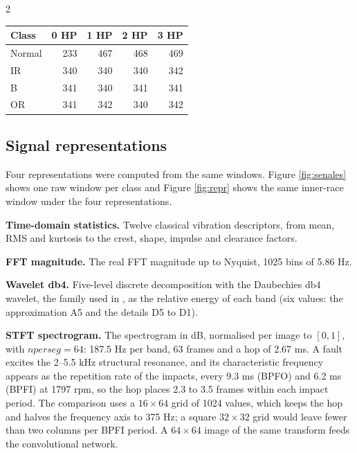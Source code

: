 \documentclass[12pt,twoside,titlepage]{ingenius}
\begin{document}
\begin{multicols}{2}
\begin{table}[H]
\centering
{}
\label{tab:ventanas}
\begin{tabular}{lrrrr}
\toprule
Class & 0 HP & 1 HP & 2 HP & 3 HP \\
\midrule
Normal & 233 & 467 & 468 & 469 \\
IR     & 340 & 340 & 340 & 342 \\
B      & 341 & 340 & 341 & 341 \\
OR     & 341 & 342 & 340 & 342 \\
\bottomrule
\end{tabular}
\end{table}

\subsection{Signal representations}

Four representations were computed from the same windows. Figure
\ref{fig:senales} shows one raw window per class and Figure \ref{fig:repr} shows
the same inner-race window under the four representations.

\textbf{Time-domain statistics.} Twelve classical vibration descriptors, from mean, RMS and kurtosis to the crest, shape, impulse and clearance factors.

\textbf{FFT magnitude.} The real FFT magnitude up to Nyquist, 1025 bins of
5.86 Hz.

\textbf{Wavelet db4.} Five-level discrete decomposition with the Daubechies db4
wavelet, the family used in \cite{gomez2023}, as the relative energy of each
band (six values: the approximation A5 and the details D5 to D1).

\textbf{STFT spectrogram.} The spectrogram in dB, normalised per image to
$[0,1]$, with $\mathit{nperseg} = 64$: 187.5 Hz per band, 63 frames and a hop of
2.67 ms. A fault excites the 2--5.5 kHz structural resonance, and its
characteristic frequency appears as the repetition rate of the impacts, every
9.3 ms (BPFO) and 6.2 ms (BPFI) at 1797 rpm, so the hop places 2.3 to 3.5
frames within each impact period. The comparison uses a $16\times64$ grid of
1024 values, which keeps the hop and halves the frequency axis to 375 Hz; a
square $32\times32$ grid would leave fewer than two columns per BPFI period. A
$64\times64$ image of the same transform feeds the convolutional network.


\end{multicols}
\end{document}
